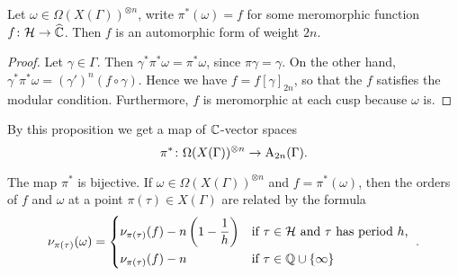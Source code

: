 \begin{prop}

 Let $\omega\in\Omega(X(\Gamma))^{\otimes n}$, write $\pi^*(\omega)=f$ for some meromorphic function $f\colon \mathcal{H}\to\widehat{\mathbb{C}}$. Then $f$ is an automorphic form of weight $2n$.
\end{prop}

\begin{proof}
 Let $\gamma\in\Gamma$. Then $\gamma^* \pi^* \omega = \pi^* \omega$, since $\pi \gamma = \gamma$. On the other hand, $\gamma^* \pi^* \omega = (\gamma')^n(f\circ\gamma)$. Hence we have $f=f[\gamma]_{2n}$, so that the $f$ satisfies the modular condition. Furthermore, $f$ is meromorphic at each cusp because $\omega$ is.
\end{proof}

By this proposition we get a map of $\mathbb{C}$-vector spaces \[\pi^*\colon\Omega(X(\Gamma))^{\otimes n}\to\mathrm{A}_{2n}(\Gamma).\]

\begin{prop} \label{pr:bijection}
 The map $\pi^*$ is bijective. If $\omega\in\Omega(X(\Gamma))^{\otimes n}$ and $f=\pi^*(\omega)$, then the orders of $f$ and $\omega$ at a point $\pi(\tau)\in X(\Gamma)$ are related by the formula
 \[\nu_{\pi(\tau)}(\omega)=\begin{dcases*}\nu_{\pi(\tau)}(f)-n\left(1-\frac{1}{h}\right) & if $\tau\in\mc{H}$ and $\tau$ has period $h$, \\
 \nu_{\pi(\tau)}(f)-n & if $\tau\in\Qbb\cup\{\infty\}$\end{dcases*}.\]
\end{prop}

